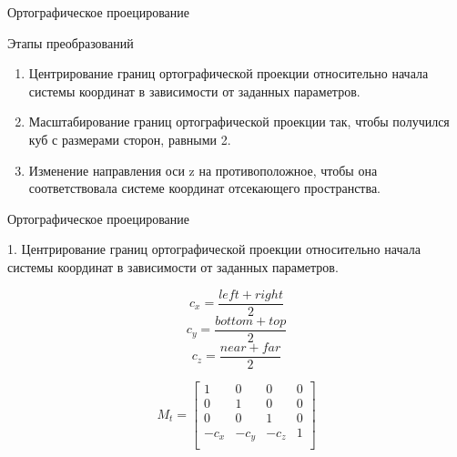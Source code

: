\documentclass{beamer}
\begin{document}
	\begin{frame}{Ортографическое проецирование}
	
		Этапы преобразований
	\begin{enumerate}
		\item
		Центрирование границ ортографической проекции относительно начала системы координат в зависимости от заданных параметров.
		\item
		Масштабирование границ ортографической проекции так, чтобы получился куб с размерами сторон, равными 2.
		\item 
		Изменение направления оси z на противоположное, чтобы она соответствовала системе координат отсекающего пространства.
	\end{enumerate}



\end{frame}
	\begin{frame}{Ортографическое проецирование}
		
		1. Центрирование границ ортографической проекции относительно начала системы координат в зависимости от заданных параметров.

		\[
			c_x = \frac{left + right}{2}
		\]
		\[
			c_y = \frac{bottom + top}{2}
		\]
		\[
			c_z = \frac{near + far}{2}
		\]

		\[
			M_t = 
			\begin{bmatrix}
				1 & 0 & 0 & 0 \\
				0 & 1 & 0 & 0 \\
				0 & 0 & 1 & 0 \\
				-c_x & -c_y & -c_z & 1 \\
			\end{bmatrix}	
		\]

	\end{frame}
\end{document}
